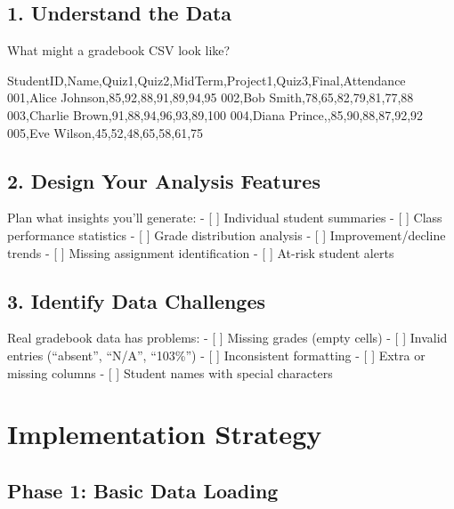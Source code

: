 \documentclass[
  letterpaper,
  DIV=11,
  numbers=noendperiod,
  oneside]{scrreprt}
\newenvironment{Shaded}{}{}
\newcommand{\NormalTok}[1]{\textcolor[rgb]{0.14,0.16,0.18}{#1}}
\begin{document}
\subsection{1. Understand the Data}\label{understand-the-data}

What might a gradebook CSV look like?

\begin{Shaded}
\begin{Highlighting}[]
\NormalTok{StudentID,Name,Quiz1,Quiz2,MidTerm,Project1,Quiz3,Final,Attendance}
\NormalTok{001,Alice Johnson,85,92,88,91,89,94,95}
\NormalTok{002,Bob Smith,78,65,82,79,81,77,88}
\NormalTok{003,Charlie Brown,91,88,94,96,93,89,100}
\NormalTok{004,Diana Prince,,85,90,88,87,92,92}
\NormalTok{005,Eve Wilson,45,52,48,65,58,61,75}
\end{Highlighting}
\end{Shaded}

\subsection{2. Design Your Analysis
Features}\label{design-your-analysis-features}

Plan what insights you'll generate: - {[} {]} Individual student
summaries - {[} {]} Class performance statistics - {[} {]} Grade
distribution analysis - {[} {]} Improvement/decline trends - {[} {]}
Missing assignment identification - {[} {]} At-risk student alerts

\subsection{3. Identify Data Challenges}\label{identify-data-challenges}

Real gradebook data has problems: - {[} {]} Missing grades (empty cells)
- {[} {]} Invalid entries (``absent'', ``N/A'', ``103\%'') - {[} {]}
Inconsistent formatting - {[} {]} Extra or missing columns - {[} {]}
Student names with special characters

\section{Implementation Strategy}\label{implementation-strategy-8}

\subsection{Phase 1: Basic Data
Loading}\label{phase-1-basic-data-loading}
\end{document}
